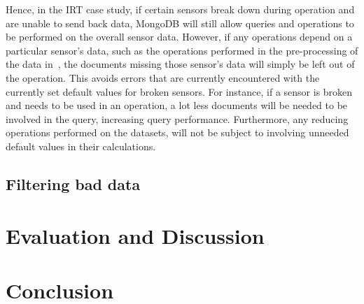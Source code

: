\documentclass[a4paper,11pt]{article}
\begin{document}
Hence, in the IRT case study, if certain sensors break down during operation and are unable to send back data, MongoDB
will still allow queries and operations to be performed on the overall sensor data. However, if any operations depend on
a particular sensor's data, such as the operations performed in the pre-processing of the data
in~, the documents missing those sensor's data will simply be left out of the operation. This
avoids errors that are currently encountered with the currently set default values for broken sensors. For instance, if
a sensor is broken and needs to be used in an operation, a lot less documents will be needed to be involved in the
query, increasing query performance. Furthermore, any reducing operations performed on the datasets, will not be subject
to involving unneeded default values in their calculations.



\subsection{Filtering bad data} %
\label{sub:filtering_bad_data}






\newpage

\section{Evaluation and Discussion} %
\label{sec:evaluation_and_discussion}



\newpage

\section{Conclusion} %
\label{sec:conclusion}


\newpage                            %



\end{document}
